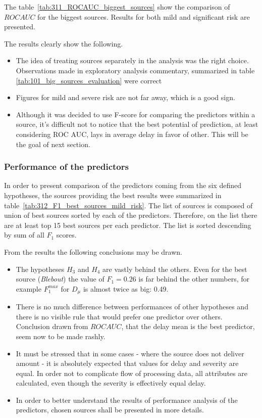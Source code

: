 \documentclass{article}
\begin{document}
\par The table\ \ref{tab:311_ROCAUC_biggest_sources} show the comparison of $ROC AUC$ for the biggest sources.
Results for both mild and significant risk are presented.

\par The results clearly show the following.
\begin{itemize}
    \item The idea of treating sources separately in the analysis was the right choice. Observations made in exploratory analysis commentary, summarized in table \ref{tab:101_big_sources_evaluation} were correct
    \item Figures for mild and severe risk are not far away, which is a good sign.
    \item Although it was decided to use F-score for comparing the predictors within a source, it's difficult not to notice that the best potential of prediction, at least considering ROC AUC, lays in average delay in favor of other. This will be the goal of next section.
\end{itemize}

\subsubsection{Performance of the predictors}

\par In order to present comparison of the predictors coming from the six defined hypotheses,
the sources providing the best results were summarized in table\ \ref{tab:312_F1_best_sources_mild_risk}.
The list of sources is composed of union of best sources sorted by each of the predictors.
Therefore, on the list there are at least top 15 best sources per each predictor.
The list is sorted descending by sum of all $F_1$ scores.



\par From the results the following conclusions may be drawn.
\begin{itemize}
    \item The hypotheses $H_3$ and $H_4$ are vastly behind the others. Even for the best source (\textit{Blebout}) the value of $F_1=0.26$ is far behind the other numbers, for example $F_1^{max}$ for $D_{\mu}$ is almost twice as big: 0.49.
    \item There is no much difference between performances of other hypotheses and there is no visible rule that would prefer one predictor over others. Conclusion drawn from $ROC AUC$, that the delay mean is the best predictor, seem now to be made rashly.
    \item It must be stressed that in some cases - where the source does not deliver amount - it is absolutely expected that values for delay and severity are equal. In order not to complicate flow of processing data, all attributes are calculated, even though the severity is effectively equal delay.
    \item In order to better understand the results of performance analysis of the predictors, chosen sources shall be presented in more details.
\end{itemize}
\end{document}
